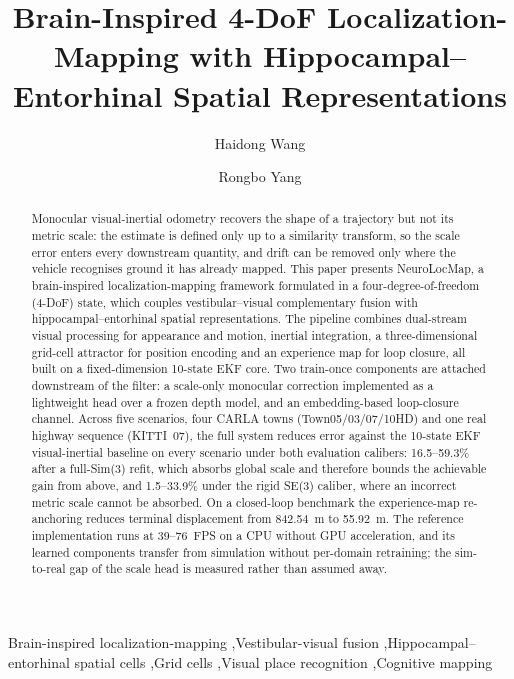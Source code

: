 \documentclass[review,12pt]{elsarticle}
\begin{document}
\begin{frontmatter}

\title{Brain-Inspired 4-DoF Localization-Mapping with Hippocampal--Entorhinal Spatial Representations}

\author[hutb]{Haidong Wang}
\author[hutb]{Rongbo Yang}


\begin{abstract}
    \sloppy
    Monocular visual-inertial odometry recovers the shape of a trajectory but not its metric scale: the estimate is defined only up to a similarity transform, so the scale error enters every downstream quantity, and drift can be removed only where the vehicle recognises ground it has already mapped. This paper presents NeuroLocMap, a brain-inspired localization-mapping framework formulated in a four-degree-of-freedom (4-DoF) state, which couples vestibular--visual complementary fusion with hippocampal--entorhinal spatial representations. The pipeline combines dual-stream visual processing for appearance and motion, inertial integration, a three-dimensional grid-cell attractor for position encoding and an experience map for loop closure, all built on a fixed-dimension 10-state EKF core. Two train-once components are attached downstream of the filter: a scale-only monocular correction implemented as a lightweight head over a frozen depth model, and an embedding-based loop-closure channel. Across five scenarios, four CARLA towns (Town05/03/07/10HD) and one real highway sequence (KITTI~07), the full system reduces error against the 10-state EKF visual-inertial baseline on every scenario under both evaluation calibers: 16.5--59.3\% after a full-Sim(3) refit, which absorbs global scale and therefore bounds the achievable gain from above, and 1.5--33.9\% under the rigid SE(3) caliber, where an incorrect metric scale cannot be absorbed. On a closed-loop benchmark the experience-map re-anchoring reduces terminal displacement from 842.54~m to 55.92~m. The reference implementation runs at 39--76~FPS on a CPU without GPU acceleration, and its learned components transfer from simulation without per-domain retraining; the sim-to-real gap of the scale head is measured rather than assumed away.
\end{abstract}

\begin{keyword}
Brain-inspired localization-mapping \sep Vestibular-visual fusion \sep Hippocampal--entorhinal spatial cells \sep Grid cells \sep Visual place recognition \sep Cognitive mapping
\end{keyword}

\end{frontmatter}
\end{document}
